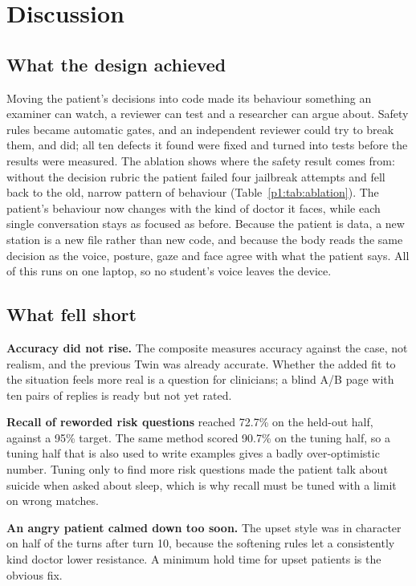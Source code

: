 
\section{Discussion}\label{sec:disc}

\subsection{What the design achieved}
Moving the patient's decisions into code made its behaviour something an examiner can watch, a reviewer can test and a researcher can argue
about. Safety rules became automatic gates, and an independent reviewer could try to break them, and did; all ten defects it found were fixed
and turned into tests before the results were measured. The ablation shows where the safety result comes from: without the decision rubric the
patient failed four jailbreak attempts and fell back to the old, narrow pattern of behaviour (Table~\ref{p1:tab:ablation}). The patient's behaviour
now changes with the kind of doctor it faces, while each single conversation stays as focused as before. Because the patient is data, a new
station is a new file rather than new code, and because the body reads the same decision as the voice, posture, gaze and face agree with what
the patient says. All of this runs on one laptop, so no student's voice leaves the device.

\subsection{What fell short}
\textbf{Accuracy did not rise.} The composite measures accuracy against the case, not realism, and the previous Twin was already accurate.
Whether the added fit to the situation feels more real is a question for clinicians; a blind A/B page with ten pairs of replies is ready but not
yet rated.

\textbf{Recall of reworded risk questions} reached 72.7\% on the held-out half, against a 95\% target. The same method scored 90.7\% on the tuning
half, so a tuning half that is also used to write examples gives a badly over-optimistic number. Tuning only to find more risk questions made the
patient talk about suicide when asked about sleep, which is why recall must be tuned with a limit on wrong matches.

\textbf{An angry patient calmed down too soon.} The upset style was in character on half of the turns after turn 10, because the softening rules
let a consistently kind doctor lower resistance. A minimum hold time for upset patients is the obvious fix.


